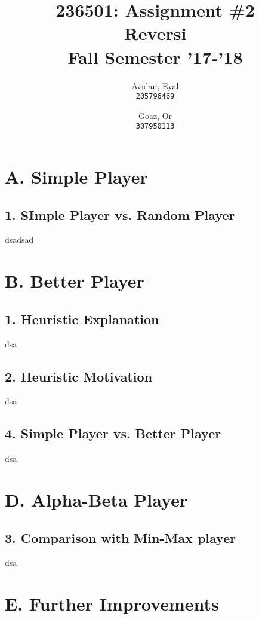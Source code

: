\documentclass{article}
\begin{document}
\title{%
  236501: Assignment \#2 \\
  \large Reversi \\
    Fall Semester '17-'18}

\author{
  Avidan, Eyal \\
  \texttt{205796469}
  \and
  Goaz, Or \\
  \texttt{307950113}
}

\maketitle

\section*{A. Simple Player}
\subsection*{1. SImple Player vs. Random Player}
dsadsad

\section*{B. Better Player}
\subsection*{1. Heuristic Explanation}
dsa

\subsection*{2. Heuristic Motivation}
dsa

\subsection*{4. Simple Player vs. Better Player}
dsa

\section*{D. Alpha-Beta Player}
\subsection*{3. Comparison with Min-Max player}
dsa

\section*{E. Further Improvements}
\end{document}
